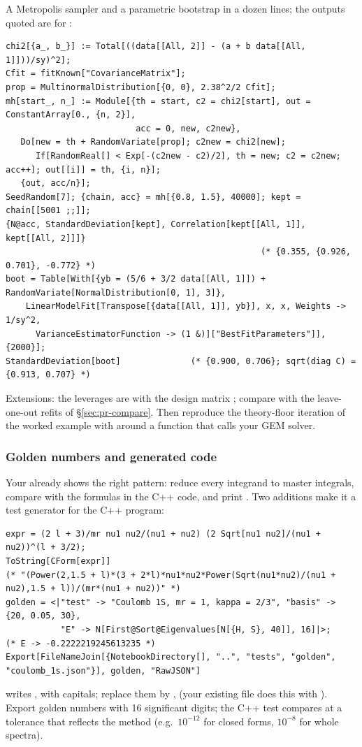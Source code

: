 \documentclass[11pt,a4paper]{article}
\numberwithin{equation}{section}
\theoremstyle{definition}
\theoremstyle{plain}
\theoremstyle{remark}
\numberwithin{algorithm}{section}
\begin{document}
A Metropolis sampler and a parametric bootstrap in a dozen lines; the outputs quoted are for :
\begin{lstlisting}[style=wl]
chi2[{a_, b_}] := Total[((data[[All, 2]] - (a + b data[[All, 1]]))/sy)^2];
Cfit = fitKnown["CovarianceMatrix"];
prop = MultinormalDistribution[{0, 0}, 2.38^2/2 Cfit];
mh[start_, n_] := Module[{th = start, c2 = chi2[start], out = ConstantArray[0., {n, 2}],
                          acc = 0, new, c2new},
   Do[new = th + RandomVariate[prop]; c2new = chi2[new];
      If[RandomReal[] < Exp[-(c2new - c2)/2], th = new; c2 = c2new; acc++]; out[[i]] = th, {i, n}];
   {out, acc/n}];
SeedRandom[7]; {chain, acc} = mh[{0.8, 1.5}, 40000]; kept = chain[[5001 ;;]];
{N@acc, StandardDeviation[kept], Correlation[kept[[All, 1]], kept[[All, 2]]]}
                                                   (* {0.355, {0.926, 0.701}, -0.772} *)
boot = Table[With[{yb = (5/6 + 3/2 data[[All, 1]]) + RandomVariate[NormalDistribution[0, 1], 3]},
    LinearModelFit[Transpose[{data[[All, 1]], yb}], x, x, Weights -> 1/sy^2,
      VarianceEstimatorFunction -> (1 &)]["BestFitParameters"]], {2000}];
StandardDeviation[boot]              (* {0.900, 0.706}; sqrt(diag C) = {0.913, 0.707} *)
\end{lstlisting}
Extensions: the leverages are  with the design matrix ; compare with the leave-one-out refits of \S\ref{sec:pr-compare}. Then reproduce the theory-floor iteration of the worked example with  around a function that calls your GEM solver.

\subsubsection{Golden numbers and generated code}\label{sec:mma-codegen}
Your  already shows the right pattern: reduce every integrand to master integrals, compare with the formulas in the C++ code, and print . Two additions make it a test generator for the C++ program:
\begin{lstlisting}[style=wl]
expr = (2 l + 3)/mr nu1 nu2/(nu1 + nu2) (2 Sqrt[nu1 nu2]/(nu1 + nu2))^(l + 3/2);
ToString[CForm[expr]]
(* "(Power(2,1.5 + l)*(3 + 2*l)*nu1*nu2*Power(Sqrt(nu1*nu2)/(nu1 + nu2),1.5 + l))/(mr*(nu1 + nu2))" *)
golden = <|"test" -> "Coulomb 1S, mr = 1, kappa = 2/3", "basis" -> {20, 0.05, 30},
           "E" -> N[First@Sort@Eigenvalues[N[{H, S}, 40]], 16]|>;      (* E -> -0.2222219245613235 *)
Export[FileNameJoin[{NotebookDirectory[], "..", "tests", "golden", "coulomb_1s.json"}], golden, "RawJSON"]
\end{lstlisting}
 writes ,  with capitals; replace them by ,  (your existing file does this with ). Export golden numbers with 16 significant digits; the C++ test compares at a tolerance that reflects the method (e.g.\ $10^{-12}$ for closed forms, $10^{-8}$ for whole spectra).
\end{document}
